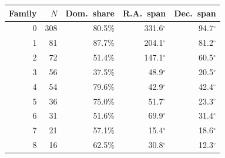 \begin{ruledtabular}
\begin{tabular}{r r r r r}
Family & $N$ & Dom.\ share & R.A.\ span & Dec.\ span \\
\hline
0 & 308 & 80.5\% & 331.6$^\circ$ & 94.7$^\circ$ \\
1 & 81 & 87.7\% & 204.1$^\circ$ & 81.2$^\circ$ \\
2 & 72 & 51.4\% & 147.1$^\circ$ & 60.5$^\circ$ \\
3 & 56 & 37.5\% & 48.9$^\circ$ & 20.5$^\circ$ \\
4 & 54 & 79.6\% & 42.9$^\circ$ & 42.4$^\circ$ \\
5 & 36 & 75.0\% & 51.7$^\circ$ & 23.3$^\circ$ \\
6 & 31 & 51.6\% & 69.9$^\circ$ & 31.4$^\circ$ \\
7 & 21 & 57.1\% & 15.4$^\circ$ & 18.6$^\circ$ \\
8 & 16 & 62.5\% & 30.8$^\circ$ & 12.3$^\circ$ \\
\end{tabular}
\end{ruledtabular}

